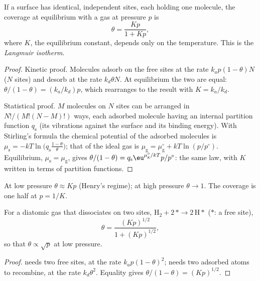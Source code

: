 \begin{theorem}\label{thm:b3:surfaces-catalysis:langmuir}
If a surface has identical, independent sites, each holding one molecule, the
coverage at equilibrium with a gas at pressure $p$ is
\[
  \theta = \frac{Kp}{1 + Kp},
\]
where $K$, the  equilibrium constant, depends only on the
temperature. This is the \emph{Langmuir isotherm}.
\end{theorem}

\begin{proof}
Kinetic proof. Molecules adsorb on the free sites at the rate $k_ap(1 - \theta)N$ ($N$
sites) and desorb at the rate $k_d\theta N$. At equilibrium the two are equal: $\theta/(1 - \theta)
= (k_a/k_d)p$, which rearranges to the result with $K = k_a/k_d$.

Statistical proof. $M$ molecules on $N$ sites can be arranged in $N!/(M!(N - M)!)$ ways,
each adsorbed molecule having an internal partition function $q_{\mathrm s}$ (its
vibrations against the surface and its binding energy). With Stirling's formula
the chemical potential of the adsorbed molecules is $\mu_{\mathrm s} = -kT\ln\bigl(q_{\mathrm s}\frac{1 - \theta}{\theta}\bigr)$;
that of the ideal gas is $\mu_{\mathrm g} = \mu_{\mathrm g}^\circ + kT\ln(p/p^\circ)$. Equilibrium, $\mu_{\mathrm s} = \mu_{\mathrm g}$, gives
$\theta/(1 - \theta) = q_{\mathrm s}\eu^{\mu_{\mathrm g}^\circ/kT}p/p^\circ$: the same law, with $K$ written in terms of
partition functions.
\end{proof}

At low pressure $\theta \approx Kp$ (Henry's regime); at high pressure $\theta \to 1$. The
coverage is one half at $p = 1/K$.

\begin{proposition}\label{prop:b3:surfaces-catalysis:dissociative}
For a diatomic gas that dissociates on two sites, $\mathrm{H_2} + 2\,{*} \to 2\,\mathrm{H}{*}$ (${*}$: a free site),
\[
  \theta = \frac{(Kp)^{1/2}}{1 + (Kp)^{1/2}},
\]
so that $\theta \propto \sqrt p$ at low pressure.
\end{proposition}

\begin{proof}
 needs two free sites, at the rate $k_ap(1 - \theta)^2$;  needs two
adsorbed atoms to recombine, at the rate $k_d\theta^2$. Equality gives $\theta/(1 - \theta) =
(Kp)^{1/2}$.
\end{proof}

